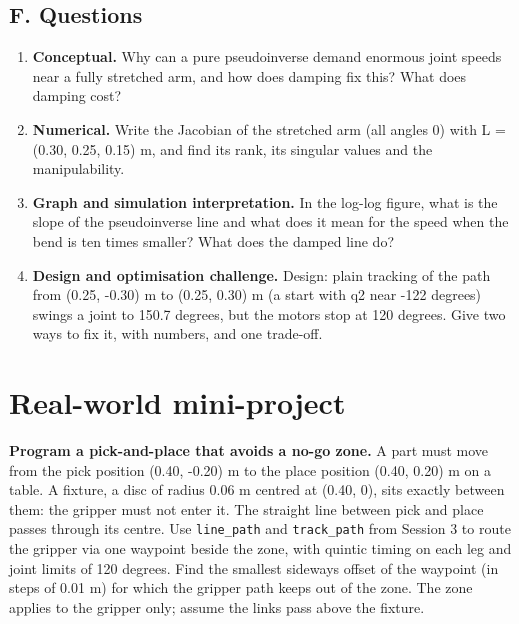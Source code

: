 \documentclass[11pt,a4paper]{article}
\begin{document}
\subsection*{F. Questions}
\begin{enumerate}[nosep]
\item \textbf{Conceptual.} Why can a pure pseudoinverse demand enormous joint speeds near a fully stretched arm, and how does damping fix this? What does damping cost?
\item \textbf{Numerical.} Write the Jacobian of the stretched arm (all angles 0) with L = (0.30, 0.25, 0.15) m, and find its rank, its singular values and the manipulability.
\item \textbf{Graph and simulation interpretation.} In the log-log figure, what is the slope of the pseudoinverse line and what does it mean for the speed when the bend is ten times smaller? What does the damped line do?
\item \textbf{Design and optimisation challenge.} Design: plain tracking of the path from (0.25, -0.30) m to (0.25, 0.30) m (a start with q2 near -122 degrees) swings a joint to 150.7 degrees, but the motors stop at 120 degrees. Give two ways to fix it, with numbers, and one trade-off.
\end{enumerate}

\section{Real-world mini-project}
\textbf{Program a pick-and-place that avoids a no-go zone.} A part must move from the pick position (0.40, -0.20) m to the place position (0.40, 0.20) m on a table. A fixture, a disc of radius 0.06 m centred at (0.40, 0), sits exactly between them: the gripper must not enter it. The straight line between pick and place passes through its centre. Use \texttt{line\_path} and \texttt{track\_path} from Session 3 to route the gripper via one waypoint beside the zone, with quintic timing on each leg and joint limits of 120 degrees. Find the smallest sideways offset of the waypoint (in steps of 0.01 m) for which the gripper path keeps out of the zone. The zone applies to the gripper only; assume the links pass above the fixture.
\end{document}

